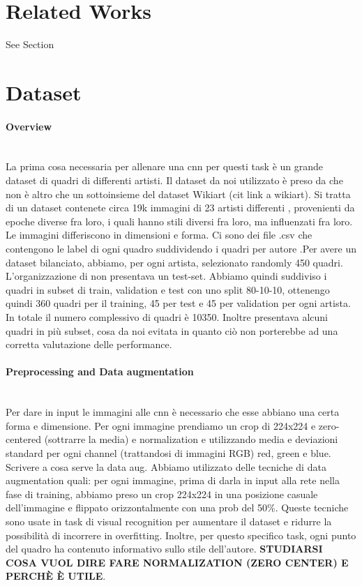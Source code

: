 \documentclass{article}
\begin{document}
\section{Related Works}

See Section \cite{ArtistIdCNN}

\section{Dataset}

\paragraph{Overview}\mbox{}\\
La prima cosa necessaria per allenare una cnn per questi task è un grande dataset di quadri di differenti artisti. Il dataset da noi utilizzato è preso da \cite{ArtGANDataset} che non è altro che un sottoinsieme del dataset Wikiart (cit link a wikiart). Si tratta di un dataset contenete circa 19k immagini di 23 artisti differenti , provenienti da epoche diverse fra loro, i quali hanno stili diversi fra loro, ma influenzati fra loro. Le immagini differiscono in dimensioni e forma.  Ci sono dei file .csv che contengono le label di ogni quadro suddividendo i quadri per  autore .Per avere un dataset bilanciato, abbiamo, per ogni artista, selezionato randomly 450 quadri.
L'organizzazione di \cite{ArtGANDataset} non presentava un test-set. Abbiamo quindi suddiviso i quadri in subset di train, validation e test con uno split 80-10-10, ottenengo quindi 360 quadri per il training, 45 per test e 45 per validation per ogni artista. In totale il numero complessivo di quadri è 10350.
Inoltre \cite{ArtGANDataset} presentava alcuni quadri in più subset, cosa da noi evitata in quanto ciò non porterebbe ad una corretta valutazione delle performance.
\paragraph{Preprocessing and Data augmentation}\mbox{}\\
Per dare in input le immagini alle cnn è necessario che esse abbiano una certa forma e dimensione. Per ogni immagine prendiamo un crop di 224x224 e zero-centered (sottrarre la media) e normalization e utilizzando media e deviazioni standard per ogni channel (trattandosi di immagini RGB) red, green e blue. \\
Scrivere a cosa serve la data aug. Abbiamo utilizzato delle tecniche di data augmentation quali: per ogni immagine, prima di darla in input alla rete nella fase di training, abbiamo preso un crop 224x224 in una posizione casuale dell'immagine e flippato orizzontalmente con una prob del 50\%. Queste tecniche sono usate in task di visual recognition per aumentare il dataset e ridurre la possibilità di incorrere in overfitting.
Inoltre, per questo specifico task, ogni punto del quadro ha contenuto informativo sullo stile dell'autore.
\textbf{STUDIARSI COSA VUOL DIRE FARE NORMALIZATION (ZERO CENTER) E PERCHÈ È UTILE}.
\end{document}
